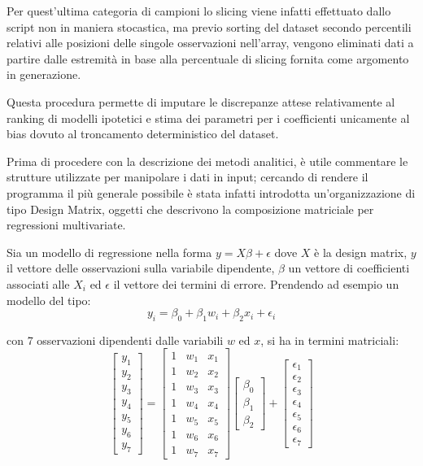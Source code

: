 \documentclass[12pt,openright,twoside,a4paper]{book}
\begin{document}
Per quest'ultima categoria di campioni lo slicing viene infatti effettuato dallo script non in maniera stocastica, ma previo sorting del dataset secondo percentili relativi alle posizioni delle singole osservazioni nell'array, vengono eliminati dati a partire dalle estremità in base alla percentuale di slicing fornita come argomento in generazione.

Questa procedura permette di imputare le discrepanze attese relativamente al ranking di modelli ipotetici e stima dei parametri per i coefficienti unicamente al bias dovuto al troncamento deterministico del dataset.

Prima di procedere con la descrizione dei metodi analitici, è utile commentare le strutture utilizzate per manipolare i dati in input; cercando di rendere il programma il più generale possibile è stata infatti introdotta un'organizzazione di tipo Design Matrix, oggetti che descrivono la  composizione matriciale per regressioni multivariate.

Sia un modello di regressione nella forma $y=X\beta+\epsilon$ dove $X$ è la design matrix, $y$ il vettore delle osservazioni sulla variabile dipendente, $\beta$ un vettore di coefficienti associati alle $X_i$ ed $\epsilon $ il vettore dei termini di errore.
Prendendo ad esempio un modello del tipo:
\begin{equation}
y_i = \beta_0 + \beta_1 w_i + \beta_2 x_i + \epsilon_i
\end{equation}

con 7 osservazioni dipendenti dalle variabili $w$ ed $x$, si ha in termini matriciali:
\begin{equation}
\begin{bmatrix}y_1 \\ y_2 \\ y_3 \\ y_4 \\ y_5 \\ y_6 \\ y_7 \end{bmatrix} =
\begin{bmatrix} 1 & w_1 & x_1  \\1 & w_2 & x_2  \\1 & w_3 & x_3  \\1 & w_4 & x_4  \\1 & w_5 & x_5  \\1 & w_6 & x_6 \\ 1& w_7  & x_7  \end{bmatrix}
\begin{bmatrix} \beta_0 \\ \beta_1 \\ \beta_2  \end{bmatrix}
+
\begin{bmatrix} \epsilon_1 \\ \epsilon_2 \\ \epsilon_3 \\ \epsilon_4 \\ \epsilon_5 \\ \epsilon_6 \\ \epsilon_7 \end{bmatrix}
\end{equation}
\end{document}
